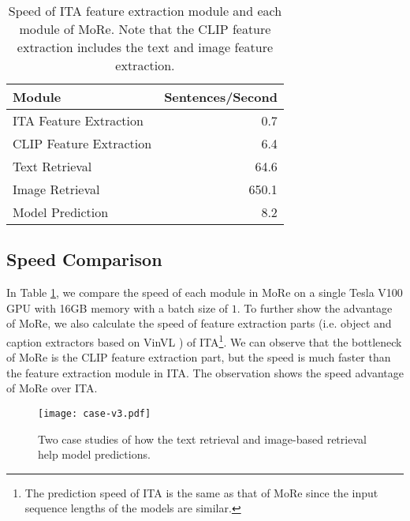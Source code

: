 \documentclass[11pt]{article}
\begin{document}
\begin{table}[t!]
\small
\setlength\tabcolsep{4pt}
\centering
\begin{tabular}{lr}
\toprule
Module &	Sentences/Second\\
\midrule
ITA Feature Extraction & 0.7 \\
CLIP Feature Extraction & 6.4\\
Text Retrieval & 64.6\\
Image Retrieval & 650.1\\
Model Prediction & 8.2 \\
\bottomrule
\end{tabular}
\caption{Speed of ITA feature extraction module and each module of MoRe. Note that the CLIP feature extraction includes the text and image feature extraction.}
\label{tab:speed}
\end{table}

\subsection{Speed Comparison}
In Table \ref{tab:speed}, we compare the speed of each module in MoRe on a single Tesla V100 GPU with 16GB memory with a batch size of $1$. To further show the advantage of MoRe, we also calculate the speed of feature extraction parts (i.e. object and caption extractors based on VinVL \citep{zhang2021vinvl}) of ITA\footnote{The prediction speed of ITA is the same as that of MoRe since the input sequence lengths of the models are similar.}. We can observe that the bottleneck of MoRe is the CLIP feature extraction part, but the speed is much faster than the feature extraction module in ITA. The observation shows the speed advantage of MoRe over ITA.



\begin{figure*}
	\centering
	\texttt{[image: case-v3.pdf]}
	\caption{Two case studies of how the text retrieval and image-based retrieval help model predictions.}
	\label{fig:cases2}
\end{figure*}
\end{document}
